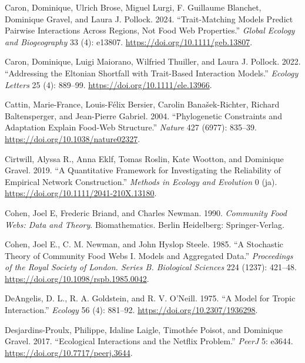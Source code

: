 \documentclass[
  letterpaper,
  DIV=11,
  numbers=noendperiod]{scrartcl}
\newlength{\cslhangindent}
\newenvironment{CSLReferences}[2] %
 {\begin{list}{}{%
  \setlength{\itemindent}{0pt}
  \setlength{\leftmargin}{0pt}
  \setlength{\parsep}{0pt}
  \ifodd #1
   \setlength{\leftmargin}{\cslhangindent}
   \setlength{\itemindent}{-1\cslhangindent}
  \fi
  \setlength{\itemsep}{#2\baselineskip}}}
 {\end{list}}
\begin{document}
\begin{CSLReferences}{1}{0}
Caron, Dominique, Ulrich Brose, Miguel Lurgi, F. Guillaume Blanchet,
Dominique Gravel, and Laura J. Pollock. 2024. {``Trait-Matching Models
Predict Pairwise Interactions Across Regions, Not Food Web
Properties.''} \emph{Global Ecology and Biogeography} 33 (4): e13807.
\url{https://doi.org/10.1111/geb.13807}.

Caron, Dominique, Luigi Maiorano, Wilfried Thuiller, and Laura J.
Pollock. 2022. {``Addressing the {Eltonian} Shortfall with Trait-Based
Interaction Models.''} \emph{Ecology Letters} 25 (4): 889--99.
\url{https://doi.org/10.1111/ele.13966}.

Cattin, Marie-France, Louis-Félix Bersier, Carolin Banašek-Richter,
Richard Baltensperger, and Jean-Pierre Gabriel. 2004. {``Phylogenetic
Constraints and Adaptation Explain Food-Web Structure.''} \emph{Nature}
427 (6977): 835--39. \url{https://doi.org/10.1038/nature02327}.

Cirtwill, Alyssa R., Anna Eklf, Tomas Roslin, Kate Wootton, and
Dominique Gravel. 2019. {``A Quantitative Framework for Investigating
the Reliability of Empirical Network Construction.''} \emph{Methods in
Ecology and Evolution} 0 (ja).
\url{https://doi.org/10.1111/2041-210X.13180}.

Cohen, Joel E, Frederic Briand, and Charles Newman. 1990.
\emph{Community {Food Webs}: {Data} and {Theory}}. Biomathematics.
Berlin Heidelberg: Springer-Verlag.

Cohen, Joel E., C. M. Newman, and John Hyslop Steele. 1985. {``A
Stochastic Theory of Community Food Webs {I}. {Models} and Aggregated
Data.''} \emph{Proceedings of the Royal Society of London. Series B.
Biological Sciences} 224 (1237): 421--48.
\url{https://doi.org/10.1098/rspb.1985.0042}.

DeAngelis, D. L., R. A. Goldstein, and R. V. O'Neill. 1975. {``A {Model}
for {Tropic Interaction}.''} \emph{Ecology} 56 (4): 881--92.
\url{https://doi.org/10.2307/1936298}.

Desjardins-Proulx, Philippe, Idaline Laigle, Timothée Poisot, and
Dominique Gravel. 2017. {``Ecological Interactions and the {Netflix}
Problem.''} \emph{PeerJ} 5: e3644.
\url{https://doi.org/10.7717/peerj.3644}.


\end{CSLReferences}
\end{document}
